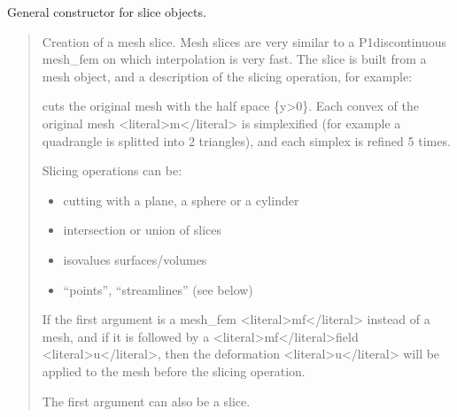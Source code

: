 \documentclass[a4paper,11pt,english]{sphinxmanual}
\begin{document}
\sphinxAtStartPar
General constructor for slice objects.
\begin{quote}

\sphinxAtStartPar
Creation of a mesh slice. Mesh slices are very similar to a
P1\sphinxhyphen{}discontinuous mesh\_fem on which interpolation is very fast. The slice is
built from a mesh object, and a description of the slicing operation, for
example:

\begin{sphinxVerbatim}[commandchars=\\\{\}]
  \PYG{p}{[}\PYG{p}{]}\PYG{p}{[}\PYG{p}{]}  
\end{sphinxVerbatim}

\sphinxAtStartPar
cuts the original mesh with the half space \{y\textgreater{}0\}. Each convex of the
original mesh \textless{}literal\textgreater{}m\textless{}/literal\textgreater{} is simplexified (for example a quadrangle is splitted
into 2 triangles), and each simplex is refined 5 times.

\sphinxAtStartPar
Slicing operations can be:
\begin{itemize}
\item {} 
\sphinxAtStartPar
cutting with a plane, a sphere or a cylinder

\item {} 
\sphinxAtStartPar
intersection or union of slices

\item {} 
\sphinxAtStartPar
isovalues surfaces/volumes

\item {} 
\sphinxAtStartPar
“points”, “streamlines” (see below)

\end{itemize}

\sphinxAtStartPar
If the first argument is a mesh\_fem \textless{}literal\textgreater{}mf\textless{}/literal\textgreater{} instead of a mesh, and if it is
followed by a \textless{}literal\textgreater{}mf\textless{}/literal\textgreater{}\sphinxhyphen{}field \textless{}literal\textgreater{}u\textless{}/literal\textgreater{}, then the deformation \textless{}literal\textgreater{}u\textless{}/literal\textgreater{} will be applied to the
mesh before the slicing operation.

\sphinxAtStartPar
The first argument can also be a slice.
\end{quote}
\end{document}
